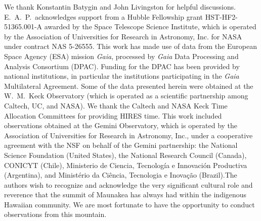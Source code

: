 \documentclass[preprint2]{aastex6}
\newcommand{\Gaia}{\textit{Gaia}\xspace}
\begin{document}
\acknowledgments 
We thank Konstantin Batygin and John Livingston for helpful discussions.  E.~A.~P.\ acknowledges support from a Hubble Fellowship grant HST-HF2-51365.001-A awarded by the Space Telescope Science Institute, which is operated by the Association of Universities for Research in Astronomy, Inc. for NASA under contract NAS 5-26555. This work has made use of data from the European Space Agency (ESA) mission \Gaia, processed by \Gaia Data Processing and Analysis Consortium (DPAC). Funding for the DPAC has been provided by national institutions, in particular the institutions participating in the \Gaia Multilateral Agreement. Some of the data presented herein were obtained at the W.~M.~Keck Observatory (which is operated as a scientific partnership among Caltech, UC, and NASA). We thank the Caltech and NASA Keck Time Allocation Committees for providing HIRES time. This work included observations obtained at the Gemini Observatory, which is operated by the Association of Universities for Research in Astronomy, Inc., under a cooperative agreement with the NSF on behalf of the Gemini partnership: the National Science Foundation (United States), the National Research Council (Canada), CONICYT (Chile), Ministerio de Ciencia, Tecnolog\'{i}a e Innovaci\'{o}n Productiva (Argentina), and Minist\'{e}rio da Ci\^{e}ncia, Tecnologia e Inova\c{c}\~{a}o (Brazil).The authors wish to recognize and acknowledge the very significant cultural role and reverence that the summit of Maunakea has always had within the indigenous Hawaiian community.  We are most fortunate to have the opportunity to conduct observations from this mountain.



\end{document}
